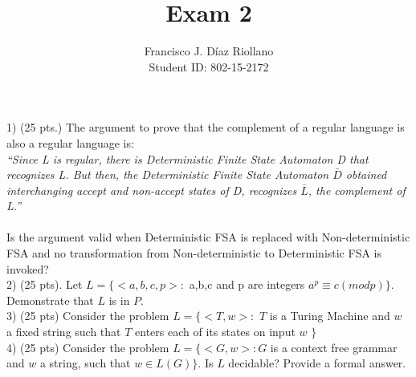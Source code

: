 \documentclass{report}
\title{Exam 2}
\author{Francisco J. Díaz Riollano \\ Student ID: 802-15-2172 }
\begin{document}
\maketitle
1) (25 pts.) The argument to prove that the complement of a regular language is also a regular language is: \\
\textit{“Since L is regular, there is Deterministic Finite State Automaton D that recognizes L. But then, the Deterministic Finite State Automaton $\bar{D}$ obtained interchanging accept and non-accept states of D, recognizes $\bar{L} $, the complement of L.”}  \\ \\ Is the argument valid when Deterministic FSA is replaced with Non-deterministic FSA and no transformation from Non-deterministic to Deterministic FSA is invoked?\\[0.2in] 


2) (25 pts). Let $L = \{< a,b,c,p >: $ a,b,c and p  are integers $a^p \equiv c(mod p) \}$. Demonstrate that $L$ is in $P$.\\[0.2in] 




3) (25 pts) Consider the problem $ L = \{<T,w>: $  $T$ is a Turing Machine and $w$ a fixed string such that $T$ enters each of its states on input $w$    $\}$\\[0.2in] 




4) (25 pts) Consider the problem $L=\{ <G,w>:G$ is a context free grammar and $w$ a string, such that $w\in L(G)\}$. Is $L$ decidable? Provide a formal answer.







\end{document}
